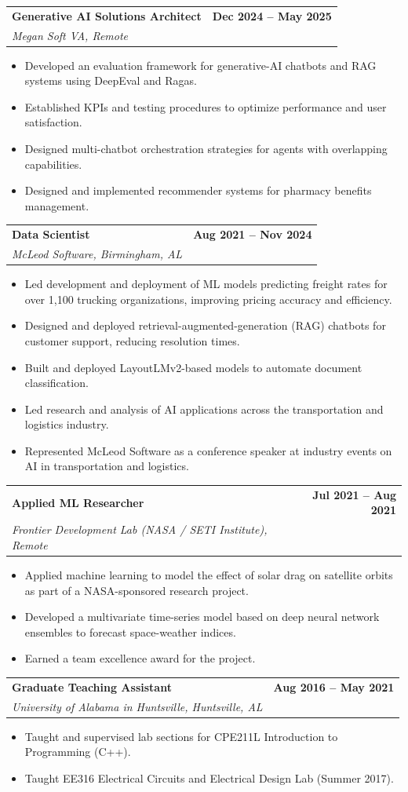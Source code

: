 \documentclass[11pt,letterpaper]{article}
\makeatletter
\newcommand{\cventry}[3]{%
  \par\vspace{0.6ex}%
  \noindent\begin{tabularx}{\textwidth}{@{}X r@{}}
    \textbf{#1} & \textbf{#3}\\
    \textit{#2} & \\
  \end{tabularx}%
  \vspace{-0.4ex}%
}
\makeatother
\begin{document}
\cventry{Generative AI Solutions Architect}{Megan Soft VA, Remote}{Dec 2024 -- May 2025}
\begin{itemize}
  \item Developed an evaluation framework for generative-AI chatbots and RAG systems using DeepEval and Ragas.
  \item Established KPIs and testing procedures to optimize performance and user satisfaction.
  \item Designed multi-chatbot orchestration strategies for agents with overlapping capabilities.
  \item Designed and implemented recommender systems for pharmacy benefits management.
\end{itemize}

\cventry{Data Scientist}{McLeod Software, Birmingham, AL}{Aug 2021 -- Nov 2024}
\begin{itemize}
  \item Led development and deployment of ML models predicting freight rates for over 1,100 trucking organizations, improving pricing accuracy and efficiency.
  \item Designed and deployed retrieval-augmented-generation (RAG) chatbots for customer support, reducing resolution times.
  \item Built and deployed LayoutLMv2-based models to automate document classification.
  \item Led research and analysis of AI applications across the transportation and logistics industry.
  \item Represented McLeod Software as a conference speaker at industry events on AI in transportation and logistics.
\end{itemize}

\cventry{Applied ML Researcher}{Frontier Development Lab (NASA / SETI Institute), Remote}{Jul 2021 -- Aug 2021}
\begin{itemize}
  \item Applied machine learning to model the effect of solar drag on satellite orbits as part of a NASA-sponsored research project.
  \item Developed a multivariate time-series model based on deep neural network ensembles to forecast space-weather indices.
  \item Earned a team excellence award for the project.
\end{itemize}

\cventry{Graduate Teaching Assistant}{University of Alabama in Huntsville, Huntsville, AL}{Aug 2016 -- May 2021}
\begin{itemize}
  \item Taught and supervised lab sections for CPE211L Introduction to Programming (C++).
  \item Taught EE316 Electrical Circuits and Electrical Design Lab (Summer 2017).
\end{itemize}
\end{document}
